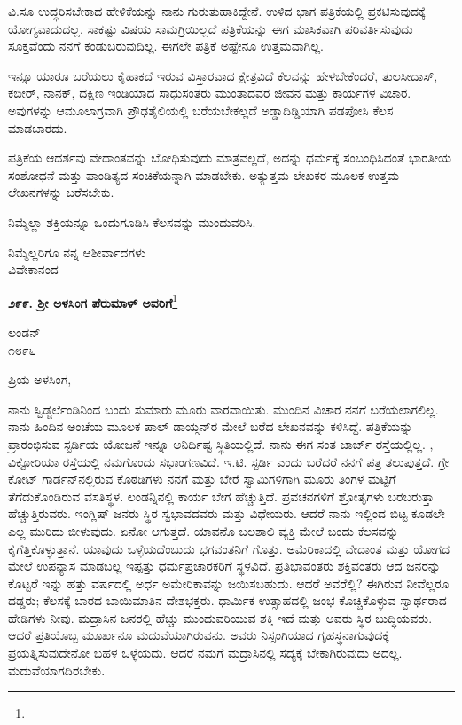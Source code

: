 \vspace{0.1cm}

ವಿ.ಸೂ\enginline{-} ಉದ್ಧರಿಸಬೇಕಾದ ಹೇಳಿಕೆಯನ್ನು ನಾನು ಗುರುತುಹಾಕಿದ್ದೇನೆ. ಉಳಿದ ಭಾಗ ಪತ್ರಿಕೆಯಲ್ಲಿ ಪ್ರಕಟಿಸುವುದಕ್ಕೆ ಯೋಗ್ಯವಾದುದಲ್ಲ. ಸಾಕಷ್ಟು ವಿಷಯ ಸಾಮಗ್ರಿಯಿಲ್ಲದೆ ಪತ್ರಿಕೆಯನ್ನು ಈಗ ಮಾಸಿಕವಾಗಿ ಪರಿವರ್ತಿಸುವುದು ಸೂಕ್ತವೆಂದು ನನಗೆ ಕಂಡುಬರುವುದಿಲ್ಲ. ಈಗಲೇ ಪತ್ರಿಕೆ ಅಷ್ಟೇನೂ ಉತ್ತಮವಾಗಿಲ್ಲ.

ಇನ್ನೂ ಯಾರೂ ಬರೆಯಲು ಕೈಹಾಕದೆ ಇರುವ ವಿಸ್ತಾರವಾದ ಕ್ಷೇತ್ರವಿದೆ\enginline{-} ಕೆಲವನ್ನು ಹೇಳಬೇಕೆಂದರೆ, ತುಲಸೀದಾಸ್, ಕಬೀರ್, ನಾನಕ್, ದಕ್ಷಿಣ ಇಂಡಿಯಾದ ಸಾಧುಸಂತರು ಮುಂತಾದವರ ಜೀವನ ಮತ್ತು ಕಾರ್ಯಗಳ ವಿಚಾರ. ಅವುಗಳನ್ನು ಆಮೂಲಾಗ್ರವಾಗಿ ಪ್ರೌಢಶೈಲಿಯಲ್ಲಿ ಬರೆಯಬೇಕಲ್ಲದೆ ಅಡ್ಡಾದಿಡ್ಡಿಯಾಗಿ ಪಡಪೋಸಿ ಕೆಲಸ ಮಾಡಬಾರದು.

ಪತ್ರಿಕೆಯ ಆದರ್ಶವು ವೇದಾಂತವನ್ನು ಬೋಧಿಸುವುದು ಮಾತ್ರವಲ್ಲದೆ, ಅದನ್ನು ಧರ್ಮಕ್ಕೆ ಸಂಬಂಧಿಸಿದಂತೆ ಭಾರತೀಯ ಸಂಶೋಧನೆ ಮತ್ತು ಪಾಂಡಿತ್ಯದ ಸಂಚಿಕೆಯನ್ನಾಗಿ ಮಾಡಬೇಕು. ಅತ್ಯುತ್ತಮ ಲೇಖಕರ ಮೂಲಕ ಉತ್ತಮ ಲೇಖನಗಳನ್ನು ಬರೆಸಬೇಕು.

ನಿಮ್ಮೆಲ್ಲಾ ಶಕ್ತಿಯನ್ನೂ ಒಂದುಗೂಡಿಸಿ ಕೆಲಸವನ್ನು ಮುಂದುವರಿಸಿ.

{\flushright
ನಿಮ್ಮೆಲ್ಲರಿಗೂ ನನ್ನ ಆಶೀರ್ವಾದಗಳು\\ವಿವೇಕಾನಂದ\par}

\begin{center}
\textbf{೨೯೯. ಶ‍್ರೀ ಅಳಸಿಂಗ ಪೆರುಮಾಳ್ ಅವರಿಗೆ}\footnote{}
\end{center}

\begin{flushright}
ಲಂಡನ್\\೧೮೯೬
\end{flushright}

\noindent
ಪ್ರಿಯ ಅಳಸಿಂಗ,

ನಾನು ಸ್ವಿಡ್ಜರ್ಲೆಂಡಿನಿಂದ ಬಂದು ಸುಮಾರು ಮೂರು ವಾರವಾಯಿತು. ಮುಂದಿನ ವಿಚಾರ ನನಗೆ ಬರೆಯಲಾಗಲಿಲ್ಲ. ನಾನು ಹಿಂದಿನ ಅಂಚೆಯ ಮೂಲಕ ಪಾಲ್ ಡಾಯ್ಸನ್‌ರ ಮೇಲೆ ಬರೆದ ಲೇಖನವನ್ನು ಕಳಿಸಿದ್ದೆ. ಪತ್ರಿಕೆಯನ್ನು ಪ್ರಾರಂಭಿಸುವ ಸ್ಟರ್ಡಿಯ ಯೋಜನೆ ಇನ್ನೂ ಅನಿರ್ದಿಷ್ಟ ಸ್ಥಿತಿಯಲ್ಲಿದೆ. ನಾನು ಈಗ ಸಂತ ಜಾರ್ಜ್ ರಸ್ತೆಯಲ್ಲಿಲ್ಲ. , ವಿಕ್ಟೋರಿಯಾ ರಸ್ತೆಯಲ್ಲಿ ನಮಗೊಂದು ಸಭಾಂಗಣವಿದೆ.  ಇ.ಟಿ. ಸ್ಟರ್ಡಿ ಎಂದು ಬರೆದರೆ ನನಗೆ ಪತ್ರ ತಲುಪುತ್ತದೆ. ಗ್ರೇ ಕೋಟ್ ಗಾರ್ಡನ್‌ನಲ್ಲಿರುವ ಕೊಠಡಿಗಳು ನನಗೆ ಮತ್ತು ಬೇರೆ ಸ್ವಾಮಿಗಳಿಗಾಗಿ ಮೂರು ತಿಂಗಳ ಮಟ್ಟಿಗೆ ತೆಗೆದುಕೊಂಡಿರುವ ವಸತಿಸ್ಥಳ. ಲಂಡನ್ನಿನಲ್ಲಿ ಕಾರ್ಯ ಬೇಗ ಹೆಚ್ಚುತ್ತಿದೆ. ಪ್ರವಚನಗಳಿಗೆ ಶ್ರೋತೃಗಳು ಬರಬರುತ್ತಾ ಹೆಚ್ಚುತ್ತಿರುವರು. ಇಂಗ್ಲಿಷ್ ಜನರು ಸ್ಥಿರ ಸ್ವಭಾವದವರು ಮತ್ತು ವಿಧೇಯರು. ಆದರೆ ನಾನು ಇಲ್ಲಿಂದ ಬಿಟ್ಟ ಕೂಡಲೇ ಎಲ್ಲ ಮುರಿದು ಬೀಳುವುದು. ಏನೋ ಆಗುತ್ತದೆ. ಯಾವನೊ ಬಲಶಾಲಿ ವ್ಯಕ್ತಿ ಮೇಲೆ ಬಂದು ಕೆಲಸವನ್ನು ಕೈಗೆತ್ತಿಕೊಳ್ಳುತ್ತಾನೆ. ಯಾವುದು ಒಳ್ಳೆಯದೆಂಬುದು ಭಗವಂತನಿಗೆ ಗೊತ್ತು. ಅಮೆರಿಕಾದಲ್ಲಿ ವೇದಾಂತ ಮತ್ತು ಯೋಗದ ಮೇಲೆ ಉಪನ್ಯಾಸ ಮಾಡಬಲ್ಲ ಇಪ್ಪತ್ತು ಧರ್ಮಪ್ರಚಾರಕರಿಗೆ ಸ್ಥಳವಿದೆ. ಪ್ರತಿಭಾವಂತರು ಶಕ್ತಿವಂತರು ಆದ ಜನರನ್ನು ಕೊಟ್ಟರೆ ಇನ್ನು ಹತ್ತು ವರ್ಷದಲ್ಲಿ ಅರ್ಧ ಅಮೇರಿಕಾವನ್ನು ಜಯಿಸಬಹುದು. ಆದರೆ ಅವರೆಲ್ಲಿ? ಈಗಿರುವ ನೀವೆಲ್ಲರೂ ದಡ್ಡರು; ಕೆಲಸಕ್ಕೆ ಬಾರದ ಬಾಯಿಮಾತಿನ ದೇಶಭಕ್ತರು. ಧಾರ್ಮಿಕ ಉತ್ಸಾಹದಲ್ಲಿ ಜಂಭ ಕೊಚ್ಚಿಕೊಳ್ಳುವ ಸ್ವಾರ್ಥರಾದ ಹೇಡಿಗಳು ನೀವು. ಮದ್ರಾಸಿನ ಜನರಲ್ಲಿ ಹೆಚ್ಚು ಮುಂದುವರಿಯುವ ಶಕ್ತಿ ಇದೆ ಮತ್ತು ಅವರು ಸ್ಥಿರ ಬುದ್ಧಿಯವರು. ಆದರೆ ಪ್ರತಿಯೊಬ್ಬ ಮೂರ್ಖನೂ ಮದುವೆಯಾಗಿರುವನು. ಅವರು ನಿಸ್ಸಂಗಿಯಾದ ಗೃಹಸ್ಥನಾಗುವುದಕ್ಕೆ ಪ್ರಯತ್ನಿಸುವುದೇನೋ ಬಹಳ ಒಳ್ಳೆಯದು. ಆದರೆ ನಮಗೆ ಮದ್ರಾಸಿನಲ್ಲಿ ಸದ್ಯಕ್ಕೆ ಬೇಕಾಗಿರುವುದು ಅದಲ್ಲ. ಮದುವೆಯಾಗದಿರಬೇಕು.

